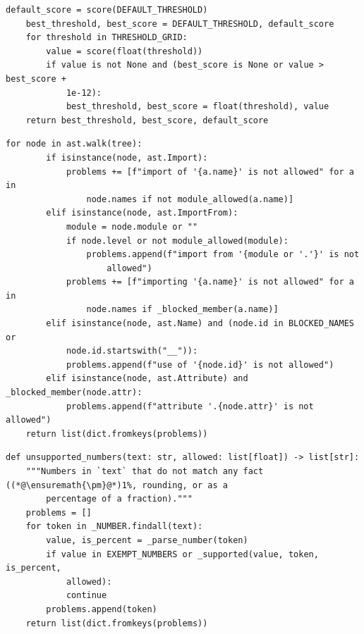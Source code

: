 \begin{lstlisting}[caption={Decision-threshold search (\code{idss/\allowbreak{}ml/\allowbreak{}evaluator.\allowbreak{}py}, inside \code{tune\_\allowbreak{}threshold})},label={lst:5.3}]
    default_score = score(DEFAULT_THRESHOLD)
    best_threshold, best_score = DEFAULT_THRESHOLD, default_score
    for threshold in THRESHOLD_GRID:
        value = score(float(threshold))
        if value is not None and (best_score is None or value > best_score +
            1e-12):
            best_threshold, best_score = float(threshold), value
    return best_threshold, best_score, default_score
\end{lstlisting}

\begin{lstlisting}[caption={Static guard of the sandbox (\code{idss/\allowbreak{}execution/\allowbreak{}sandbox.\allowbreak{}py}, inside \code{check\_\allowbreak{}code})},label={lst:5.4}]
    for node in ast.walk(tree):
        if isinstance(node, ast.Import):
            problems += [f"import of '{a.name}' is not allowed" for a in
                node.names if not module_allowed(a.name)]
        elif isinstance(node, ast.ImportFrom):
            module = node.module or ""
            if node.level or not module_allowed(module):
                problems.append(f"import from '{module or '.'}' is not
                    allowed")
            problems += [f"importing '{a.name}' is not allowed" for a in
                node.names if _blocked_member(a.name)]
        elif isinstance(node, ast.Name) and (node.id in BLOCKED_NAMES or
            node.id.startswith("__")):
            problems.append(f"use of '{node.id}' is not allowed")
        elif isinstance(node, ast.Attribute) and _blocked_member(node.attr):
            problems.append(f"attribute '.{node.attr}' is not allowed")
    return list(dict.fromkeys(problems))
\end{lstlisting}

\begin{lstlisting}[caption={Grounding check of the decision brief (\code{idss/\allowbreak{}agents/\allowbreak{}insight\_\allowbreak{}agent.\allowbreak{}py})},label={lst:5.5}]
def unsupported_numbers(text: str, allowed: list[float]) -> list[str]:
    """Numbers in `text` that do not match any fact ((*@\ensuremath{\pm}@*)1%, rounding, or as a
        percentage of a fraction)."""
    problems = []
    for token in _NUMBER.findall(text):
        value, is_percent = _parse_number(token)
        if value in EXEMPT_NUMBERS or _supported(value, token, is_percent,
            allowed):
            continue
        problems.append(token)
    return list(dict.fromkeys(problems))
\end{lstlisting}

